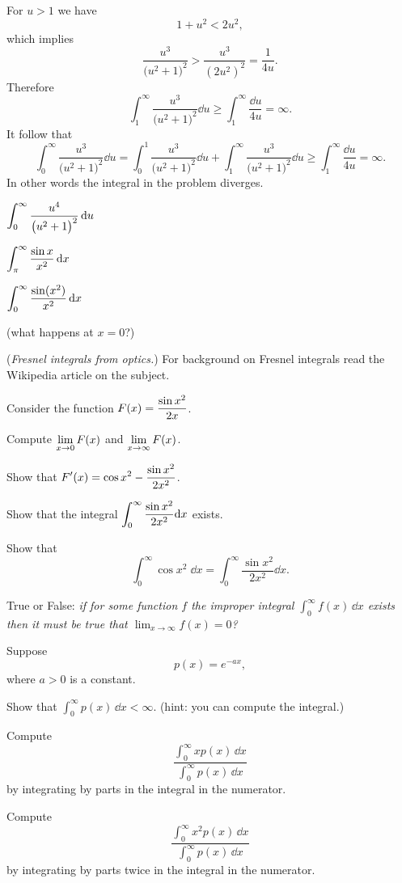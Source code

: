 \begin{multicols}{2}
For $u>1$ we have 
\[
  1+u^2 < 2u^2,
\]
which implies
\[
\frac{u^3} {\bigl(u^2+1\bigr)^2} >
\frac{u^3}{(2u^2)^2} =  \frac{1}{4u}.
\]
Therefore
\[
  \int_1^\infty \frac{u^3} {\bigl(u^2+1\bigr)^2} \dd u \geq 
  \int_1^\infty \frac{\dd u}{4u} =\infty.
\]
It follow that
\[
  \int_0^\infty \frac{u^3} {\bigl(u^2+1\bigr)^2}\dd u
  =
  \int_0^1\frac{u^3} {\bigl(u^2+1\bigr)^2}\dd u
  +
  \int_1^\infty\frac{u^3} {\bigl(u^2+1\bigr)^2}\dd u
  \geq
  \int_1^\infty \frac{\dd u}{4u} =\infty.
\]
In other words the integral in the problem diverges.

\endanswer

\problem $\displaystyle \int_0^\infty \frac{u^4} {\bigl(u^2+1\bigr)^2}\,\mathrm{d} u$ %

\problem $\displaystyle \int_\pi^\infty \frac{\sin x} {x^2}\,\mathrm{d} x$ %

\problem $\displaystyle \int_0^\infty \frac{\sin(x^2)} {x^2}\,\mathrm{d} x$\hfill %
\parbox{60pt}{\flushright(what happens at $x=0$?)}


\problem\groupproblem  (\textit{Fresnel integrals from optics.}) %
For background on Fresnel integrals read the Wikipedia article on the subject.

\noindent%
Consider the function $\displaystyle F(x) = \frac{\sin x^2} {2x}$.

\subprob Compute $\displaystyle\lim_{x\to0} F(x)$ and $\displaystyle \lim_{x\to\infty} F(x)$.

\subprob Show that $\displaystyle F'(x) = \cos x^2 - \frac{\sin x^2} {2x^2}$.

\subprob Show that the integral $\displaystyle \int_0^\infty \frac{\sin x^2} {2x^2}\mathrm{d} x$ exists.

\subprob Show that
\[
\int_0^\infty \cos x^2\;\dd x = \int_0^\infty \frac{\sin
x^2} {2x^2}\dd x.
\]

\subprob True or False: \textit{if for some function $f$ the improper integral
$\int_0^\infty f(x)\, \dd x$ exists then it must be true that $\lim_{x\to\infty}
f(x) =0$?}

\problem\groupproblem  Suppose %
\[
p(x) = e^{-ax},
\]
where $a>0$ is a constant.

\subprob Show that $\int_0^\infty p(x)\,\dd x<\infty$.  (hint:
you can compute the integral.)

\subprob Compute
\[
\frac{\int_0^\infty x p(x)\, \dd x} {\int_0^\infty p(x)\,\dd x}
\]
by integrating by parts in the integral in the numerator.

\subprob Compute
\[
\frac{\int_0^\infty x^2 p(x)\, \dd x} {\int_0^\infty p(x)\,\dd x}
\]
by integrating by parts twice in the integral in the numerator.


\end{multicols}
